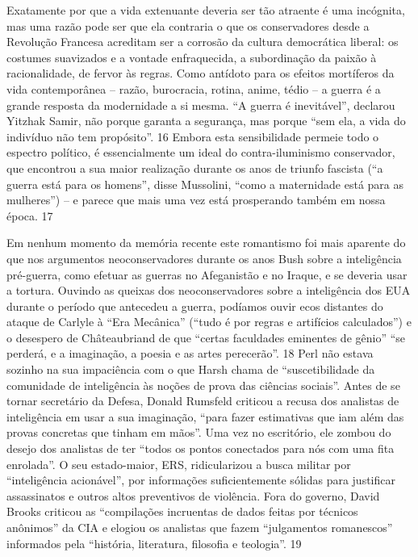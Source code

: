 \par
 
Exatamente por que a vida extenuante deveria ser tão atraente é uma incógnita, mas uma razão pode ser que ela contraria o que os conservadores desde a Revolução Francesa acreditam ser a corrosão da cultura democrática liberal: os costumes suavizados e a vontade enfraquecida, a subordinação da paixão à racionalidade, de fervor às regras. Como antídoto para os efeitos mortíferos da vida contemporânea – razão, burocracia, rotina, anime, tédio – a guerra é a grande resposta da modernidade a si mesma. “A guerra é inevitável”, declarou Yitzhak Samir, não porque garanta a segurança, mas porque “sem ela, a vida do indivíduo não tem propósito”.
 {\color{blue} 16}  
Embora esta sensibilidade permeie todo o espectro político, é essencialmente um ideal do contra-iluminismo conservador, que encontrou a sua maior realização durante os anos de triunfo fascista (“a guerra está para os homens”, disse Mussolini, “como a maternidade está para as mulheres”) – e parece que mais uma vez está prosperando também em nossa época.
 {\color{blue} 17}  

 
\par
 
Em nenhum momento da memória recente este romantismo foi mais aparente do que nos argumentos neoconservadores durante os anos Bush sobre a inteligência pré-guerra, como efetuar as guerras no Afeganistão e no Iraque, e se deveria usar a tortura. Ouvindo as queixas dos neoconservadores sobre a inteligência dos EUA durante o período que antecedeu a guerra, podíamos ouvir ecos distantes do ataque de Carlyle à “Era Mecânica” (“tudo é por regras e artifícios calculados”) e o desespero de Châteaubriand de que “certas faculdades eminentes de gênio” “se perderá, e a imaginação, a poesia e as artes perecerão”.
 {\color{blue} 18}  
Perl não estava sozinho na sua impaciência com o que Harsh chama de “suscetibilidade da comunidade de inteligência às noções de prova das ciências sociais”. Antes de se tornar secretário da Defesa, Donald Rumsfeld criticou a recusa dos analistas de inteligência em usar a sua imaginação, “para fazer estimativas que iam além das provas concretas que tinham em mãos”. Uma vez no escritório, ele zombou do desejo dos analistas de ter “todos os pontos conectados para nós com uma fita enrolada”. O seu estado-maior, ERS, ridicularizou a busca militar por “inteligência acionável”, por informações suficientemente sólidas para justificar assassinatos e outros altos preventivos de violência. Fora do governo, David Brooks criticou as “compilações incruentas de dados feitas por técnicos anônimos” da CIA e elogiou os analistas que fazem “julgamentos romanescos” informados pela “história, literatura, filosofia e teologia”.
 {\color{blue} 19}  

